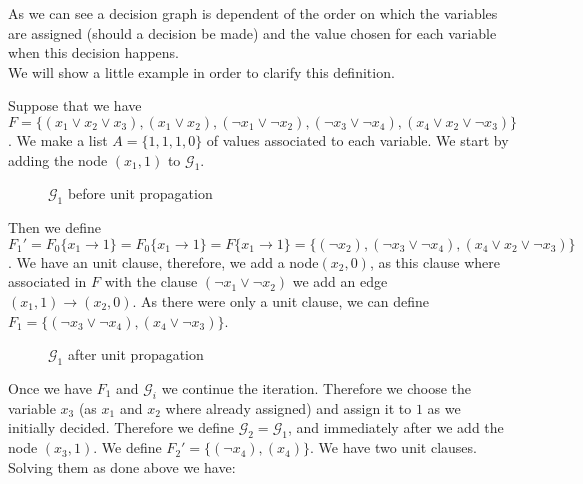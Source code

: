  As we can see a decision graph is dependent of the order on which the variables are assigned (should a decision be made) and the value chosen for each variable when this decision happens.\\

 We will show a little example in order to clarify this definition.
\begin{example} Suppose that we have $F = \{(x_1\vee x_2 \vee x_3), ( x_1 \vee x_2), (\neg x_1 \vee \neg x_2), (\neg x_3 \vee \neg x_4), (x_4 \vee x_2 \vee \neg x_3) \}$. We make a list $A=\{1,1,1,0\}$ of values associated to each variable. We start by adding the node $(x_1,1)$ to $\mathcal{G}_1$. \\
\begin{figure}[H]
  \centering
  \caption{$\mathcal{G}_1$ before unit propagation}
\end{figure}

Then we define $F_1' = F_0\{x_1\to 1\} =F_0\{x_1\to 1\} = F\{x_1 \to 1\}= \{(\neg x_2), (\neg x_3 \vee \neg x_4), (x_4 \vee x_2 \vee\neg x_3)\}$. We have an unit clause, therefore, we add a node$(x_2, 0)$, as this clause where associated in $F$ with the clause $(\neg x_1 \vee \neg x_2)$ we add an edge $(x_1,1)\to (x_2,0)$. As there were only a unit clause, we can define $F_1 = \{(\neg x_3 \vee \neg x_4), (x_4 \vee \neg x_3)\}$.

\begin{figure}[H]
  \centering
  \caption{$\mathcal{G}_1$ after unit propagation}
\end{figure} 

Once we have $F_1$ and $\mathcal{G}_i$ we continue the iteration. Therefore we choose the variable $x_3$ (as $x_1$ and $x_2$ where already assigned) and assign it to $1$ as we initially decided. Therefore we define $\mathcal{G}_2 = \mathcal{G}_1 $, and immediately after we add the node $(x_3,1)$. We define $F_2' = \{(\neg x_4), (x_4)\}$. We have two unit clauses. Solving them as done above we have: 


\end{example}
